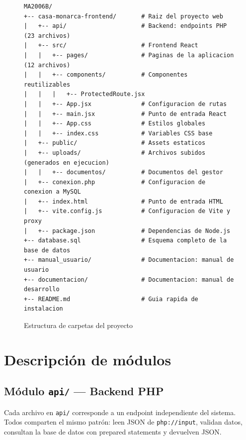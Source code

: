 \documentclass[10pt,letterpaper]{report}
\begin{document}
\begin{figure}[H]
\centering
\begin{Verbatim}[frame=single,rulecolor=\color{gray!40},fontsize=\small]
MA2006B/
+-- casa-monarca-frontend/       # Raiz del proyecto web
|   +-- api/                     # Backend: endpoints PHP (23 archivos)
|   +-- src/                     # Frontend React
|   |   +-- pages/               # Paginas de la aplicacion (12 archivos)
|   |   +-- components/          # Componentes reutilizables
|   |   |   +-- ProtectedRoute.jsx
|   |   +-- App.jsx              # Configuracion de rutas
|   |   +-- main.jsx             # Punto de entrada React
|   |   +-- App.css              # Estilos globales
|   |   +-- index.css            # Variables CSS base
|   +-- public/                  # Assets estaticos
|   +-- uploads/                 # Archivos subidos (generados en ejecucion)
|   |   +-- documentos/          # Documentos del gestor
|   +-- conexion.php             # Configuracion de conexion a MySQL
|   +-- index.html               # Punto de entrada HTML
|   +-- vite.config.js           # Configuracion de Vite y proxy
|   +-- package.json             # Dependencias de Node.js
+-- database.sql                 # Esquema completo de la base de datos
+-- manual_usuario/              # Documentacion: manual de usuario
+-- documentacion/               # Documentacion: manual de desarrollo
+-- README.md                    # Guia rapida de instalacion
\end{Verbatim}
\caption{Estructura de carpetas del proyecto}
\label{fig:estructura}
\end{figure}

\section{Descripción de módulos}

\subsection{Módulo \texttt{api/} — Backend PHP}

Cada archivo en \texttt{api/} corresponde a un endpoint independiente del sistema. Todos comparten el mismo patrón: leen JSON de \texttt{php://input}, validan datos, consultan la base de datos con prepared statements y devuelven JSON.
\end{document}
